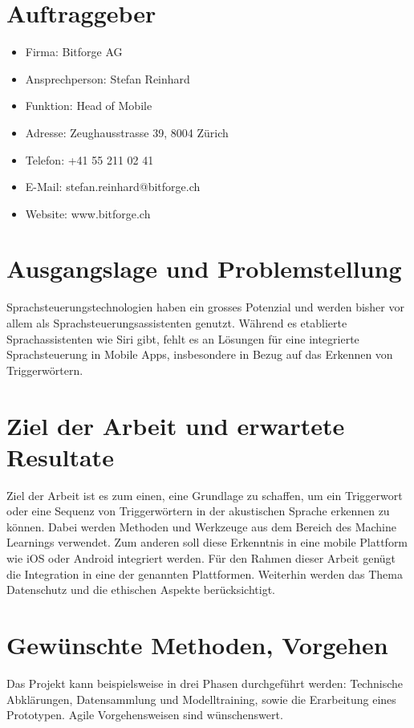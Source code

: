 \documentclass[11pt,a4paper]{article}
\begin{document}
\section*{Auftraggeber}
\begin{itemize}
    \item Firma: Bitforge AG
    \item Ansprechperson: Stefan Reinhard
    \item Funktion: Head of Mobile
    \item Adresse: Zeughausstrasse 39, 8004 Zürich
    \item Telefon: +41 55 211 02 41
    \item E-Mail: stefan.reinhard@bitforge.ch
    \item Website: www.bitforge.ch
\end{itemize}

\section*{Ausgangslage und Problemstellung}
Sprachsteuerungstechnologien haben ein grosses Potenzial und werden bisher vor allem als
Sprachsteuerungsassistenten genutzt. Während es etablierte Sprachassistenten wie Siri gibt,
fehlt es an Lösungen für eine integrierte Sprachsteuerung in Mobile Apps, insbesondere in
Bezug auf das Erkennen von Triggerwörtern.

\section*{Ziel der Arbeit und erwartete Resultate}
Ziel der Arbeit ist es zum einen, eine Grundlage zu schaffen, um ein Triggerwort oder eine
Sequenz von Triggerwörtern in der akustischen Sprache erkennen zu können. Dabei werden
Methoden und Werkzeuge aus dem Bereich des Machine Learnings verwendet. Zum anderen soll
diese Erkenntnis in eine mobile Plattform wie iOS oder Android integriert werden. Für den
Rahmen dieser Arbeit genügt die Integration in eine der genannten Plattformen. Weiterhin
werden das Thema Datenschutz und die ethischen Aspekte berücksichtigt.

\section*{Gewünschte Methoden, Vorgehen}
Das Projekt kann beispielsweise in drei Phasen durchgeführt werden: Technische Abklärungen,
Datensammlung und Modelltraining, sowie die Erarbeitung eines Prototypen. Agile
Vorgehensweisen sind wünschenswert.
\end{document}
